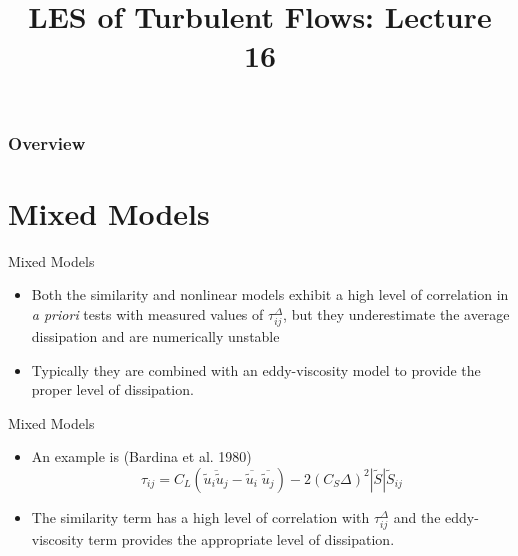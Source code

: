  
\title{LES of Turbulent Flows: Lecture 16}



\begin{frame} 
  \titlepage
\end{frame}


\begin{frame}
\frametitle{Overview}
\tableofcontents
\end{frame}

\section{Mixed Models} %
\begin{frame}{Mixed Models}
\begin{itemize}
	\item Both the similarity and nonlinear models exhibit a high level of correlation in \textit{a priori} tests with measured values of $\tau_{ij}^{\Delta}$, but they underestimate the average dissipation and are numerically unstable
	\item Typically they are combined with an eddy-viscosity model to provide the proper level of dissipation.
\end{itemize}

\end{frame}

\begin{frame}{Mixed Models}
\begin{itemize}
	\item An example is (Bardina et al. 1980)
	$$\boxed{\tau_{ij} = C_L \left( \overline{\widetilde{u}_i\widetilde{u}_j} - \overline{\widetilde{u}_i}\; \overline{\widetilde{u}_j} \right) - 2(C_S \Delta)^2|\widetilde{S}|\widetilde{S}_{ij}}$$
	\item The similarity term has a high level of correlation with $\tau_{ij}^{\Delta}$ and the eddy-viscosity term provides the appropriate level of dissipation.
\end{itemize}

\end{frame}


